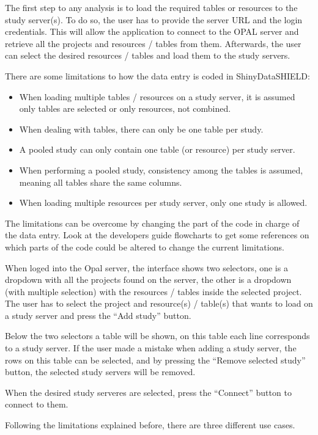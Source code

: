 \documentclass[
]{book}
\providecommand{\tightlist}{%
  \setlength{\itemsep}{0pt}\setlength{\parskip}{0pt}}
\begin{document}
The first step to any analysis is to load the required tables or resources to the study server(s). To do so, the user has to provide the server URL and the login credentials. This will allow the application to connect to the OPAL server and retrieve all the projects and resources / tables from them. Afterwards, the user can select the desired resources / tables and load them to the study servers.

There are some limitations to how the data entry is coded in ShinyDataSHIELD:

\begin{itemize}
\tightlist
\item
  When loading multiple tables / resources on a study server, it is assumed only tables are selected or only resources, not combined.
\item
  When dealing with tables, there can only be one table per study.
\item
  A pooled study can only contain one table (or resource) per study server.
\item
  When performing a pooled study, consistency among the tables is assumed, meaning all tables share the same columns.
\item
  When loading multiple resources per study server, only one study is allowed.
\end{itemize}

The limitations can be overcome by changing the part of the code in charge of the data entry. Look at the developers guide flowcharts to get some references on which parts of the code could be altered to change the current limitations.

When loged into the Opal server, the interface shows two selectors, one is a dropdown with all the projects found on the server, the other is a dropdown (with multiple selection) with the resources / tables inside the selected project. The user has to select the project and resource(s) / table(s) that wants to load on a study server and press the ``Add study'' button.

Below the two selectors a table will be shown, on this table each line corresponds to a study server. If the user made a mistake when adding a study server, the rows on this table can be selected, and by pressing the ``Remove selected study'' button, the selected study servers will be removed.

When the desired study serveres are selected, press the ``Connect'' button to connect to them.

Following the limitations explained before, there are three different use cases.
\end{document}
